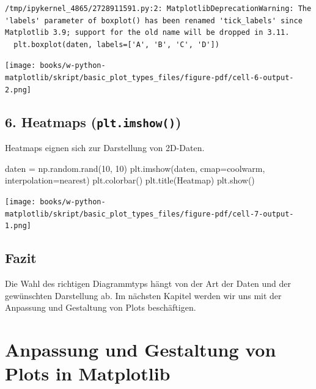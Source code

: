 \documentclass[
  letterpaper,
  DIV=11,
  numbers=noendperiod]{scrreprt}
\newenvironment{Shaded}{\begin{snugshade}}{\end{snugshade}}
\newcommand{\DecValTok}[1]{\textcolor[rgb]{0.68,0.00,0.00}{#1}}
\newcommand{\NormalTok}[1]{\textcolor[rgb]{0.00,0.23,0.31}{#1}}
\newcommand{\OperatorTok}[1]{\textcolor[rgb]{0.37,0.37,0.37}{#1}}
\newcommand{\StringTok}[1]{\textcolor[rgb]{0.13,0.47,0.30}{#1}}
\begin{document}
\begin{verbatim}
/tmp/ipykernel_4865/2728911591.py:2: MatplotlibDeprecationWarning: The 'labels' parameter of boxplot() has been renamed 'tick_labels' since Matplotlib 3.9; support for the old name will be dropped in 3.11.
  plt.boxplot(daten, labels=['A', 'B', 'C', 'D'])
\end{verbatim}

\texttt{[image: books/w-python-matplotlib/skript/basic\_plot\_types\_files/figure-pdf/cell-6-output-2.png]}

\section{\texorpdfstring{6. Heatmaps
(\texttt{plt.imshow()})}{6. Heatmaps (plt.imshow())}}\label{heatmaps-plt.imshow}

Heatmaps eignen sich zur Darstellung von 2D-Daten.

\begin{Shaded}
\begin{Highlighting}[]
\NormalTok{daten }\OperatorTok{=}\NormalTok{ np.random.rand(}\DecValTok{10}\NormalTok{, }\DecValTok{10}\NormalTok{)}
\NormalTok{plt.imshow(daten, cmap}\OperatorTok{=}\StringTok{\textquotesingle{}coolwarm\textquotesingle{}}\NormalTok{, interpolation}\OperatorTok{=}\StringTok{\textquotesingle{}nearest\textquotesingle{}}\NormalTok{)}
\NormalTok{plt.colorbar()}
\NormalTok{plt.title(}\StringTok{\textquotesingle{}Heatmap\textquotesingle{}}\NormalTok{)}
\NormalTok{plt.show()}
\end{Highlighting}
\end{Shaded}

\texttt{[image: books/w-python-matplotlib/skript/basic\_plot\_types\_files/figure-pdf/cell-7-output-1.png]}

\section{Fazit}\label{fazit}

Die Wahl des richtigen Diagrammtyps hängt von der Art der Daten und der
gewünschten Darstellung ab. Im nächsten Kapitel werden wir uns mit der
Anpassung und Gestaltung von Plots beschäftigen.

\chapter{Anpassung und Gestaltung von Plots in
Matplotlib}\label{anpassung-und-gestaltung-von-plots-in-matplotlib}
\end{document}

